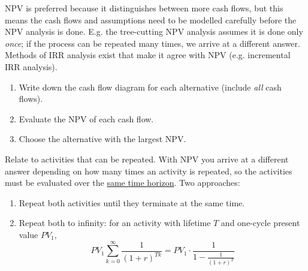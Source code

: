 NPV is preferred because it distinguishes between more cash flows, but this means the cash flows and assumptions need to be modelled carefully before the NPV analysis is done. E.g. the tree-cutting NPV analysis assumes it is done only \textit{once}; if the process can be repeated many times, we arrive at a different answer. Methods of IRR analysis exist that make it agree with NPV (e.g. incremental IRR analysis).

\begin{enumerate}
    \item Write down the cash flow diagram for each alternative (include \textit{all} cash flows).
    \item Evaluate the NPV of each cash flow.
    \item Choose the alternative with the largest NPV.
\end{enumerate}

Relate to activities that can be repeated. With NPV you arrive at a different answer depending on how many times an activity is repeated, so the activities must be evaluated over the \underline{same time horizon}. Two approaches:
\begin{enumerate}
    \item Repeat both activities until they terminate at the same time.
    \item Repeat both to infinity: for an activity with lifetime $T$ and one-cycle present value $PV_1$,
    \[PV_1\sum_{k=0}^{\infty}\frac{1}{(1+r)^{Tk}} = PV_1\cdot\frac{1}{1-\frac{1}{(1+r)^T}}\]
\end{enumerate}

